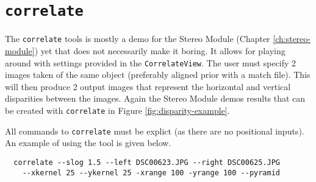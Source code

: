 \section{{\tt correlate}}\label{sec:correlate}

The \verb#correlate# tools is mostly a demo for the Stereo Module
(Chapter \ref{ch:stereo-module}) yet that does not necessarily make it
boring. It allows for playing around with settings provided in the
{\tt CorrelateView}. The user must specify 2 images taken of the same
object (preferably aligned prior with a match file). This will then
produce 2 output images that represent the horizontal and vertical
disparities between the images. Again the Stereo Module demos results
that can be created with \verb#correlate# in Figure
\ref{fig:disparity-example}.

All commands to \verb#correlate# must be explict (as there are no
positional inputs). An example of using the tool is given below.

\begin{verbatim}
  correlate --slog 1.5 --left DSC00623.JPG --right DSC00625.JPG
    --xkernel 25 --ykernel 25 -xrange 100 -yrange 100 --pyramid
\end{verbatim}

